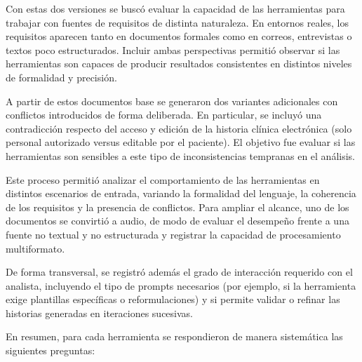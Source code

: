 Con estas dos versiones se buscó evaluar la capacidad de las herramientas para trabajar con fuentes de requisitos de distinta naturaleza. En entornos reales, los requisitos aparecen tanto en documentos formales como en correos, entrevistas o textos poco estructurados. Incluir ambas perspectivas permitió observar si las herramientas son capaces de producir resultados consistentes en distintos niveles de formalidad y precisión.

A partir de estos documentos base se generaron dos variantes adicionales con conflictos introducidos de forma deliberada. En particular, se incluyó una contradicción respecto del acceso y edición de la historia clínica electrónica (solo personal autorizado versus editable por el paciente). El objetivo fue evaluar si las herramientas son sensibles a este tipo de inconsistencias tempranas en el análisis.

Este proceso permitió analizar el comportamiento de las herramientas en distintos escenarios de entrada, variando la formalidad del lenguaje, la coherencia de los requisitos y la presencia de conflictos. Para ampliar el alcance, uno de los documentos se convirtió a audio, de modo de evaluar el desempeño frente a una fuente no textual y no estructurada y registrar la capacidad de procesamiento multiformato.

De forma transversal, se registró además el grado de interacción requerido con el analista, incluyendo el tipo de prompts necesarios (por ejemplo, si la herramienta exige plantillas específicas o reformulaciones) y si permite validar o refinar las historias generadas en iteraciones sucesivas.

En resumen, para cada herramienta se respondieron de manera sistemática las siguientes preguntas:

